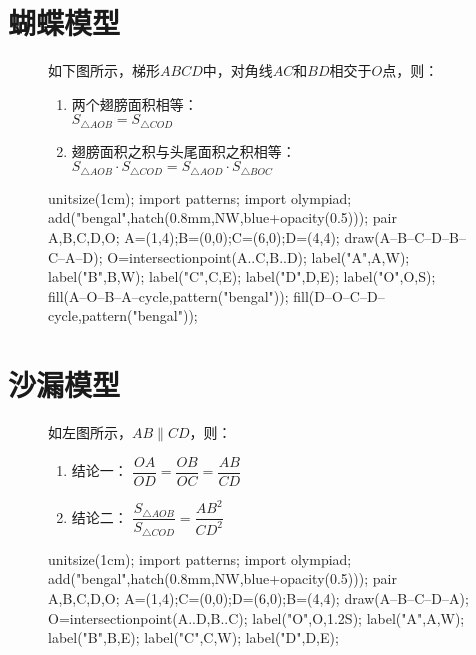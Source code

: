 \documentclass[12pt,space]{ctexart} %
\begin{document}
\section{蝴蝶模型}
\begin{figure}[ht]
	\begin{minipage}[b]{0.5\textwidth}
		如下图所示，梯形$ABCD$中，对角线$AC$和$BD$相交于$O$点，则：
		\begin{enumerate}
			\item 两个翅膀面积相等：\\
			      $S_{\triangle AOB}=S_{\triangle COD}$
			\item 翅膀面积之积与头尾面积之积相等：\\
			      $S_{\triangle AOB}\cdot S_{\triangle COD}=S_{\triangle AOD}\cdot S_{\triangle BOC}$
		\end{enumerate}
	\end{minipage}
	\qquad
	\begin{minipage}[b]{0.4\textwidth}
		\begin{asy}
			unitsize(1cm);
			import patterns;
			import olympiad;
			add("bengal",hatch(0.8mm,NW,blue+opacity(0.5)));
			pair A,B,C,D,O;
			A=(1,4);B=(0,0);C=(6,0);D=(4,4);
			draw(A--B--C--D--B--C--A--D);
			O=intersectionpoint(A..C,B..D);
			label("A",A,W);
			label("B",B,W);
			label("C",C,E);
			label("D",D,E);
			label("O",O,S);
			fill(A--O--B--A--cycle,pattern("bengal"));
			fill(D--O--C--D--cycle,pattern("bengal"));
		\end{asy}
	\end{minipage}
\end{figure}
\vspace{1cm}
\section{沙漏模型}
\begin{figure}[ht]
	\begin{minipage}[b]{0.45\textwidth}
		如左图所示，$AB\parallel CD$，则：
		\begin{enumerate}
			\item 结论一： $\dfrac{OA}{OD}=\dfrac{OB}{OC}=\dfrac{AB}{CD}$
			\item 结论二： $\dfrac{S_{\triangle AOB}}{S_{\triangle COD}}=\dfrac{AB^2}{CD^2}$
		\end{enumerate}
	\end{minipage}
	\qquad
	\begin{minipage}[b]{0.45\textwidth}
		\begin{asy}
			unitsize(1cm);
			import patterns;
			import olympiad;
			add("bengal",hatch(0.8mm,NW,blue+opacity(0.5)));
			pair A,B,C,D,O;
			A=(1,4);C=(0,0);D=(6,0);B=(4,4);
			draw(A--B--C--D--A);
			O=intersectionpoint(A..D,B..C);
			label("O",O,1.2S);
			label("A",A,W);
			label("B",B,E);
			label("C",C,W);
			label("D",D,E);
		\end{asy}
	\end{minipage}
\end{figure}
\vspace{1cm}
\end{document}
